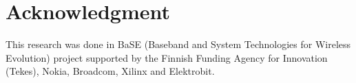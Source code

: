 \documentclass[conference,letterpaper,10pt]{./../../IEEE/IEEEtran}
\begin{document}
\section*{Acknowledgment}
This research was done in BaSE (Baseband and System Technologies for Wireless Evolution) project supported by the Finnish Funding Agency for Innovation (Tekes), Nokia, Broadcom, Xilinx and Elektrobit.



%
\end{document}
